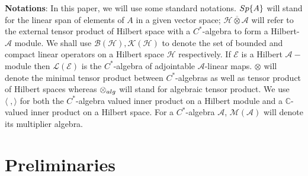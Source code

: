 \documentclass{amsart}
\theoremstyle{plain}
\theoremstyle{definition}
\theoremstyle{remark}
\numberwithin{equation}{section}
\newcommand{\cal}{\mathcal}
\newcommand{\cla}{{\cal A}}
\newcommand{\cle}{\cal{E}}
\newcommand{\cll}{{\cal L}}
\newcommand{\clm}{{\cal M}}
\begin{document}
\textbf{Notations}: In this paper, we will use some standard notations. ${\rm Sp}\{A\}$ will stand for the linear span of elements of $A$ in a given vector space; $\mathcal{H}\overline{\otimes}\mathcal{A}$ will refer to the external tensor product of Hilbert space with a $C^{\ast}$-algebra to form a Hilbert-$\cla$ module. We shall use $\mathcal{B}( \mathcal{H}), \mathcal{K}(\mathcal{H})$ to denote the set of bounded and compact linear operators on a Hilbert space $\mathcal{H}$ respectively. If $\cle$ is a Hilbert $\mathcal{A}-$module then $\cll(\cle)$ is the $C^{\ast}$-algebra of adjointable $\mathcal{A}$-linear maps. $\otimes$ will denote the minimal tensor product between $C^{\ast}$-algebras as well as tensor product of Hilbert spaces whereas $\otimes_{\rm{alg}}$ will stand for algebraic tensor product. We use $\langle\;,\rangle$ for both the $C^{\ast}$-algebra valued inner product on a Hilbert module and a $\mathbb{C}$-valued inner product on a Hilbert space. For a $C^{\ast}$-algebra $\cla$, $\clm(\cla)$ will denote its multiplier algebra.
\section{Preliminaries}
\end{document}
